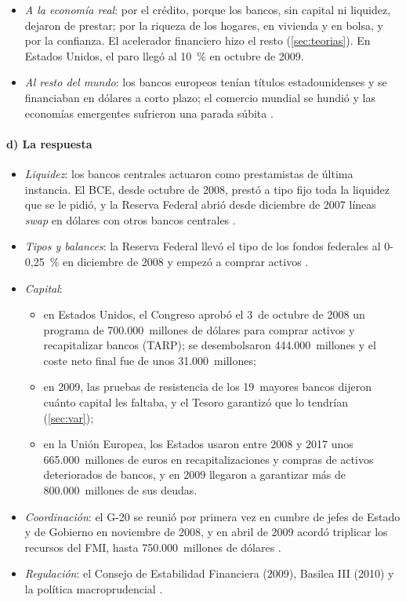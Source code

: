 \documentclass[11pt]{article}
\begin{document}
\begin{itemize}
\item \emph{A la economía real}: por el crédito, porque los bancos, sin capital ni liquidez, dejaron de prestar; por la riqueza de los hogares, en vivienda y en bolsa, y por la confianza. El acelerador financiero hizo el resto (\ref{sec:teorias}). En Estados Unidos, el paro llegó al 10~\% en octubre de 2009\nocite{BLS2026Paro}.
\item \emph{Al resto del mundo}: los bancos europeos tenían títulos estadounidenses y se financiaban en dólares a corto plazo; el comercio mundial se hundió y las economías emergentes sufrieron una parada súbita .
\end{itemize}

\paragraph{d) La respuesta}

\begin{itemize}
\item \emph{Liquidez}: los bancos centrales actuaron como prestamistas de última instancia. El BCE, desde octubre de 2008, prestó a tipo fijo toda la liquidez que se le pidió, y la Reserva Federal abrió desde diciembre de 2007 líneas \emph{swap} en dólares con otros bancos centrales  .
\item \emph{Tipos y balances}: la Reserva Federal llevó el tipo de los fondos federales al 0-0,25~\% en diciembre de 2008\nocite{Fed2026OpenMarket} y empezó a comprar activos  .
\item \emph{Capital}:
  \begin{itemize}
  \item en Estados Unidos, el Congreso aprobó el 3~de octubre de 2008 un programa de 700.000~millones de dólares para comprar activos y recapitalizar bancos (TARP); se desembolsaron 444.000~millones y el coste neto final fue de unos 31.000~millones\nocite{CBO2024TARP};
  \item en 2009, las pruebas de resistencia de los 19~mayores bancos dijeron cuánto capital les faltaba, y el Tesoro garantizó que lo tendrían\nocite{FED2009SCAP} (\ref{sec:var});
  \item en la Unión Europea, los Estados usaron entre 2008 y 2017 unos 665.000~millones de euros en recapitalizaciones y compras de activos deteriorados de bancos, y en 2009 llegaron a garantizar más de 800.000~millones de sus deudas\nocite{CE2019Scoreboard2018}.
  \end{itemize}
\item \emph{Coordinación}: el G-20 se reunió por primera vez en cumbre de jefes de Estado y de Gobierno en noviembre de 2008, y en abril de 2009 acordó triplicar los recursos del FMI, hasta 750.000~millones de dólares\nocite{G202009London}  .
\item \emph{Regulación}: el Consejo de Estabilidad Financiera (2009), Basilea III (2010) y la política macroprudencial .
\end{itemize}
\end{document}
